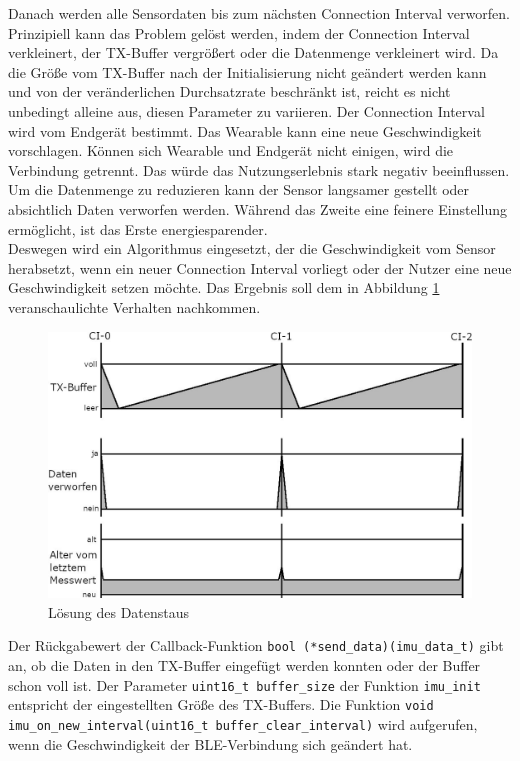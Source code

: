 Danach werden alle Sensordaten bis zum nächsten Connection Interval verworfen.\\
Prinzipiell kann das Problem gelöst werden, indem der Connection Interval verkleinert, der TX-Buffer vergrößert oder die Datenmenge verkleinert wird.
Da die Größe vom TX-Buffer nach der Initialisierung nicht geändert werden kann und von der veränderlichen Durchsatzrate beschränkt ist, reicht es nicht unbedingt alleine aus, diesen Parameter zu variieren.
Der Connection Interval wird vom Endgerät bestimmt.
Das Wearable kann eine neue Geschwindigkeit vorschlagen.
Können sich Wearable und Endgerät nicht einigen, wird die Verbindung getrennt.
Das würde das Nutzungserlebnis stark negativ beeinflussen.
Um die Datenmenge zu reduzieren kann der Sensor langsamer gestellt oder absichtlich Daten verworfen werden.
Während das Zweite eine feinere Einstellung ermöglicht, ist das Erste energiesparender.\\
Deswegen wird ein Algorithmus eingesetzt, der die Geschwindigkeit vom Sensor herabsetzt, wenn ein neuer Connection Interval vorliegt oder der Nutzer eine neue Geschwindigkeit setzen möchte.
Das Ergebnis soll dem in Abbildung \ref{fig:daten_nachher} veranschaulichte Verhalten nachkommen.
\begin{figure}[!hbtp]
	\centering
	\includegraphics[width=0.76\linewidth]{res/datenNachher.jpg}
	\caption{Lösung des Datenstaus}
	\label{fig:daten_nachher}
\end{figure}
Der Rückgabewert der Callback-Funktion \texttt{bool (*send\_data)(imu\_data\_t)} gibt an, ob die Daten in den TX-Buffer eingefügt werden konnten oder der Buffer schon voll ist.
Der Parameter \texttt{uint16\_t buffer\_size} der Funktion \texttt{imu\_init} entspricht der eingestellten Größe des TX-Buffers.
Die Funktion \texttt{void imu\_on\_new\_interval(\allowbreak{}uint16\_t buffer\_clear\_interval)} wird aufgerufen, wenn die Geschwindigkeit der BLE-Verbindung sich geändert hat.
